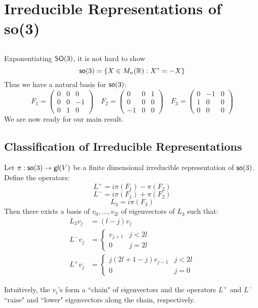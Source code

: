 \section{Irreducible Representations of so(3)}

\subsection{}
Exponentiating $\operatorname{\textsf{SO}}(3)$, it is not hard to show
\[
    \operatorname{\textsf{so}}(3) = \{X \in M_n({\mathbb R}): X^* = - X\}
\]
Thus we have a natural basis for $\operatorname{\textsf{so}}(3)$:
\[
    F_1 =
    \begin{pmatrix}
        0&0&0\\
        0&0&-1\\
        0&1&0
    \end{pmatrix}
    \quad
    F_2 = 
    \begin{pmatrix}
        0&0&1\\
        0&0&0\\
        -1&0&0
    \end{pmatrix}
    \quad
    F_3 =
    \begin{pmatrix}
        0&-1&0\\
        1&0&0\\
        0&0&0
    \end{pmatrix}
\]
We are now ready for our main result.

\subsection{Classification of Irreducible Representations}
\begin{thm}
    Let $\pi: \operatorname{\textsf{so}}(3) \rightarrow \operatorname{\textsf{gl}}(V)$ be a finite dimensional irreducible representation of $\operatorname{\textsf{so}}(3)$. Define the operators:
    \[
        L^+ = i\pi(F_1) - \pi(F_2)
    \]
    \[
        L^- = i\pi(F_1) + \pi(F_2)
    \]
    \[
        L_3 = i\pi(F_3)
    \]
    Then there exists a basis of $v_0, \dots, v_{2l}$ of eigenvectors of $L_3$ such that:
    \[
        \begin{split}
            L_3v_j &= (l - j )v_j\\
           L^- v_j &= 
        \begin{cases}
            v_{j+1} & j < 2l\\
            0   & j = 2l
        \end{cases}\\
           L^+ v_j &= 
        \begin{cases}
            j(2l + 1 - j)v_{j-1} & j < 2l\\
            0   & j = 0
        \end{cases}
        \end{split}
    \]
\end{thm}
Intuitively, the $v_i$'s form a ``chain" of eigenvectors and the operators $L^+$ and $L^-$ ``raise" and ``lower" eigenvectors along the chain, respectively.

